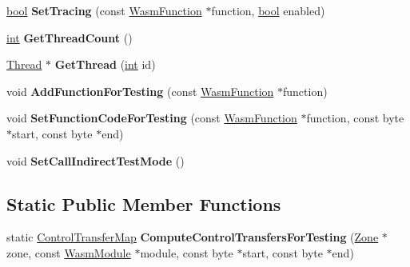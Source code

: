 \begin{DoxyCompactItemize}
\mbox{\hyperlink{classbool}{bool}} {\bfseries Set\+Tracing} (const \mbox{\hyperlink{structv8_1_1internal_1_1wasm_1_1WasmFunction}{Wasm\+Function}} $\ast$function, \mbox{\hyperlink{classbool}{bool}} enabled)
\item 
\mbox{\label{classv8_1_1internal_1_1wasm_1_1WasmInterpreter_a2112068287675168978119a66852311c}} 
\mbox{\hyperlink{classint}{int}} {\bfseries Get\+Thread\+Count} ()
\item 
\mbox{\label{classv8_1_1internal_1_1wasm_1_1WasmInterpreter_aec6d2dcd43f600dfb96e55d0f20c9071}} 
\mbox{\hyperlink{classv8_1_1internal_1_1wasm_1_1WasmInterpreter_1_1Thread}{Thread}} $\ast$ {\bfseries Get\+Thread} (\mbox{\hyperlink{classint}{int}} id)
\item 
\mbox{\label{classv8_1_1internal_1_1wasm_1_1WasmInterpreter_a0a7a5f67ec2572b02d8eb922419384e1}} 
void {\bfseries Add\+Function\+For\+Testing} (const \mbox{\hyperlink{structv8_1_1internal_1_1wasm_1_1WasmFunction}{Wasm\+Function}} $\ast$function)
\item 
\mbox{\label{classv8_1_1internal_1_1wasm_1_1WasmInterpreter_a6143b60fdd8722e1a831a9511218a173}} 
void {\bfseries Set\+Function\+Code\+For\+Testing} (const \mbox{\hyperlink{structv8_1_1internal_1_1wasm_1_1WasmFunction}{Wasm\+Function}} $\ast$function, const byte $\ast$start, const byte $\ast$end)
\item 
\mbox{\label{classv8_1_1internal_1_1wasm_1_1WasmInterpreter_ae92c5d911adc718652b9f369e0391e47}} 
void {\bfseries Set\+Call\+Indirect\+Test\+Mode} ()
\end{DoxyCompactItemize}
\subsection*{Static Public Member Functions}
\begin{DoxyCompactItemize}
\item 
\mbox{\label{classv8_1_1internal_1_1wasm_1_1WasmInterpreter_ab04cf07bde3bed727c4c9e4816881911}} 
static \mbox{\hyperlink{classv8_1_1internal_1_1ZoneMap}{Control\+Transfer\+Map}} {\bfseries Compute\+Control\+Transfers\+For\+Testing} (\mbox{\hyperlink{classv8_1_1internal_1_1Zone}{Zone}} $\ast$zone, const \mbox{\hyperlink{structv8_1_1internal_1_1wasm_1_1WasmModule}{Wasm\+Module}} $\ast$module, const byte $\ast$start, const byte $\ast$end)
\end{DoxyCompactItemize}


